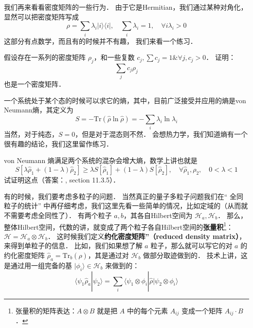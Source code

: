 我们再来看看密度矩阵的一些行为． 由于它是Hermitian，我们通过某种对角化，显然可以把密度矩阵写成
\begin{equation}
\rho = \sum_i\lambda_i|i\rangle\langle i|,\quad \sum_i\lambda_i = 1,\quad \forall i\lambda_i > 0 
\end{equation}
这部分有点数学，而且有的时候并不有趣， 我们来看一个练习．

\begin{exercise}{}
假设存在一系列的密度矩阵 $\rho_j$，和一些复数 $c_j, \sum c_j = 1 \& \forall j, c_j>0$． 证明：
\begin{equation}
\sum_j c_j \rho_j 
\end{equation}
也是一个密度矩阵．
\end{exercise}

一个系统处于某个态的时候可以求它的熵，其中，目前广泛接受并应用的熵是von Neumann熵，其定义为
\begin{equation}
S=-\text{Tr}(\hat\rho\ln\hat\rho)=-\sum_i\lambda_i\ln\lambda_i
\end{equation}
当然，对于纯态，$S=0$，但是对于混态则不然． 会想热力学，我们知道熵有一个很有趣的结论，我们这里留作练习．

\begin{exercise}{}
von Neumann 熵满足两个系统的混杂会增大熵，数学上讲也就是
\begin{equation}
S[\lambda\hat\rho_1+(1-\lambda)\hat\rho_2]\ge\lambda S[\hat\rho_1]+(1-\lambda) S[\hat\rho_2],\quad \forall \hat\rho_1,\rho_2,\quad 0<\lambda<1
\end{equation}
试证明这点（答案：\cite{nielsen2010quantum}, section 11.3.5）．
\end{exercise}

有的时候，我们要考虑多粒子的问题． 当然真正的量子多粒子问题我们在“ 全同粒子的统计” 中再仔细考虑，我们这里先看一些简单的情况，比如定域的（从而就不需要考虑全同性了）． 有两个粒子 $a, b$，其各自Hilbert空间为 $\mathcal{H}_a, \mathcal{H}_b$． 那么，整体Hilbert空间，代数的讲，就变成了两个粒子各自Hilbert空间的\textbf{张量积}\footnote{张量积的矩阵表达：$A\otimes B$ 就是把 $A$ 中的每个元素 $A_{ij}$ 变成一个矩阵 $A_{ij}\cdot B$．}：$\mathcal{H} = \mathcal{H}_a\otimes \mathcal{H}_b$． 这时候我们定义\textbf{约化密度矩阵”（reduced density matrix）}，来得到单粒子的信息． 比如，我们如果想了解 $a$ 粒子，那么就可以写它的对 $a$ 的约化密度矩阵 $\hat\rho_a=\text{Tr}_b(\hat\rho)$，其是通过对 $\mathcal{H}_b$ 做部分取迹做到的． 技术上讲，这是通过用一组完备的基 $|\phi_i\rangle \in\mathcal{H}_b$ 来做到的：
\begin{equation}
\langle\psi_1\hat\rho_a|\psi_2\rangle=\sum_i\langle\psi_1\otimes\phi_i|\hat\rho|\psi_2\otimes\phi_i\rangle
\end{equation}

